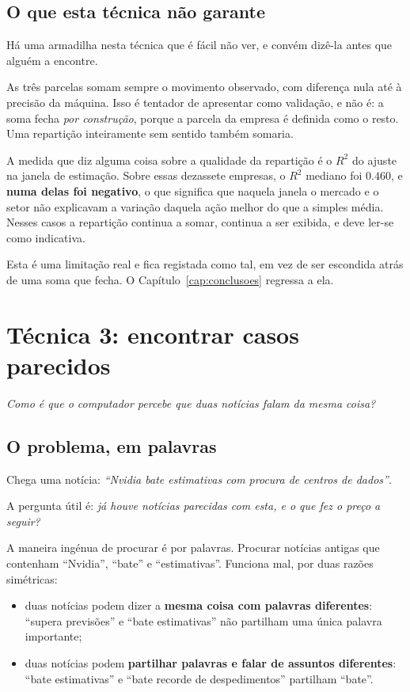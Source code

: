 \subsection{O que esta técnica não garante}

Há uma armadilha nesta técnica que é fácil não ver, e convém dizê-la antes que alguém a encontre.

As três parcelas somam sempre o movimento observado, com diferença nula até à precisão da máquina.
Isso é tentador de apresentar como validação, e não é: a soma fecha \emph{por construção}, porque a
parcela da empresa é definida como o resto. Uma repartição inteiramente sem sentido também somaria.

A medida que diz alguma coisa sobre a qualidade da repartição é o $R^2$ do ajuste na janela de
estimação. Sobre essas dezassete empresas, o $R^2$ mediano foi $0.460$, e \textbf{numa delas foi negativo}, o
que significa que naquela janela o mercado e o setor não explicavam a variação daquela ação melhor
do que a simples média. Nesses casos a repartição continua a somar, continua a ser exibida, e deve
ler-se como indicativa.

Esta é uma limitação real e fica registada como tal, em vez de ser escondida atrás de uma soma que
fecha. O Capítulo~\ref{cap:conclusoes} regressa a ela.

\section{Técnica 3: encontrar casos parecidos}
\label{sec:met_recuperacao}

\emph{Como é que o computador percebe que duas notícias falam da mesma coisa?}

\subsection{O problema, em palavras}

Chega uma notícia: \emph{``Nvidia bate estimativas com procura de centros de dados''}.

A pergunta útil é: \emph{já houve notícias parecidas com esta, e o que fez o preço a seguir?}

A maneira ingénua de procurar é por palavras. Procurar notícias antigas que contenham ``Nvidia'',
``bate'' e ``estimativas''. Funciona mal, por duas razões simétricas:

\begin{itemize}
  \item duas notícias podem dizer a \textbf{mesma coisa com palavras diferentes}:
        ``supera previsões'' e ``bate estimativas'' não partilham uma única palavra importante;
  \item duas notícias podem \textbf{partilhar palavras e falar de assuntos diferentes}: ``bate
        estimativas'' e ``bate recorde de despedimentos'' partilham ``bate''.
\end{itemize}

